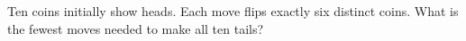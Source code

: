 Ten coins initially show heads. Each move flips exactly six distinct coins. What is the fewest moves needed to make all ten tails?
